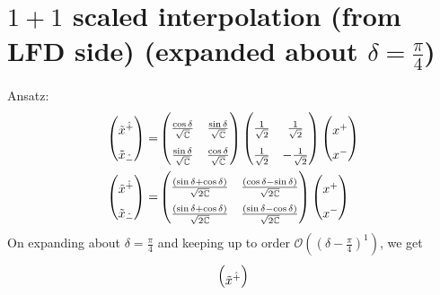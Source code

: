 \documentclass[]{article}
\numberwithin{equation}{section}
\begin{document}
{{\section{$1+1$ scaled interpolation (from LFD side) (expanded about $\delta=\frac{\pi}{4}$)}
Ansatz:
\begin{align}
  \begin{pmatrix}
   \rule{0pt}{16pt} \tilde{x}^{\hat{+}}\\
    \rule{0pt}{16pt} \tilde{x}_{\hat{-}}
  \end{pmatrix}=&
  \begin{pmatrix}
    \rule{0pt}{16pt} \frac{\cos\delta}{\sqrt{\mathbb{C}}}  & \frac{\sin\delta}{\sqrt{\mathbb{C}}} \\
    \rule{0pt}{16pt} \frac{\sin\delta}{\sqrt{\mathbb{C}}}  & \frac{\cos\delta}{\sqrt{\mathbb{C}}}
  \end{pmatrix}
  \begin{pmatrix}
    \rule{0pt}{16pt} \frac{1}{\sqrt{2}}  & \frac{1}{\sqrt{2}} \\
    \rule{0pt}{16pt} \frac{1}{\sqrt{2}}  & -\frac{1}{\sqrt{2}}
  \end{pmatrix}
  \begin{pmatrix}
    \rule{0pt}{16pt} x^{+}\\
   \rule{0pt}{16pt} x^{-}
  \end{pmatrix}\\
   \begin{pmatrix}
   \rule{0pt}{16pt} \tilde{x}^{\hat{+}}\\
    \rule{0pt}{16pt} \tilde{x}_{\hat{-}}
  \end{pmatrix}=&
  \begin{pmatrix}
    \rule{0pt}{16pt} \frac{(\sin\delta+\cos\delta)}{\sqrt{2\mathbb{C}}}  & \frac{(\cos\delta-\sin\delta)}{\sqrt{2\mathbb{C}}} \\
    \rule{0pt}{16pt} \frac{(\sin\delta+\cos\delta)}{\sqrt{2\mathbb{C}}}  & \frac{(\sin\delta-\cos\delta)}{\sqrt{2\mathbb{C}}}
  \end{pmatrix}
  \begin{pmatrix}
    \rule{0pt}{16pt} x^{+}\\
   \rule{0pt}{16pt} x^{-}
  \end{pmatrix}
\end{align}
On expanding about $\delta=\frac{\pi}{4}$ and keeping up to order $\mathcal{O}\left((\delta-\frac{\pi}{4})^{1}\right)$, we get
\begin{align}
    \begin{pmatrix}
   \rule{0pt}{16pt} \tilde{x}^{\hat{+}}\\

\end{pmatrix}
\end{align}}}
\end{document}

